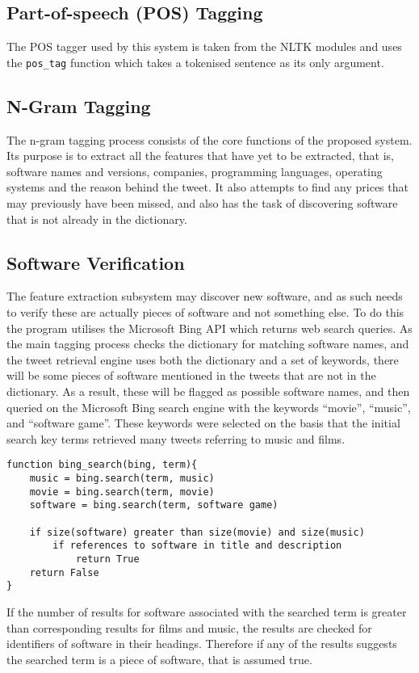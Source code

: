 \subsection{Part-of-speech (POS) Tagging}
The POS tagger used by this system is taken from the NLTK modules and uses the \texttt{pos\_tag} function which takes a tokenised sentence as its only argument.

\subsection{N-Gram Tagging}
The n-gram tagging process consists of the core functions of the proposed system. Its purpose is to extract all the features that have yet to be extracted, that is, software names and versions, companies, programming languages, operating systems and the reason behind the tweet. It also attempts to find any prices that may previously have been missed, and also has the task of discovering software that is not already in the dictionary.

\subsection{Software Verification}
The feature extraction subsystem may discover new software, and as such needs to verify these are actually pieces of software and not something else. To do this the program utilises the Microsoft Bing API which returns web search queries. As the main tagging process checks the dictionary for matching software names, and the tweet retrieval engine uses both the dictionary and a set of keywords, there will be some pieces of software mentioned in the tweets that are not in the dictionary. As a result, these will be flagged as possible software names, and then queried on the Microsoft Bing search engine with the keywords ``movie'', ``music'', and ``software game''. These keywords were selected on the basis that the initial search key terms retrieved many tweets referring to music and films.
\begin{verbatim}
function bing_search(bing, term){
    music = bing.search(term, music)
    movie = bing.search(term, movie)
    software = bing.search(term, software game)

    if size(software) greater than size(movie) and size(music)
        if references to software in title and description
            return True
    return False
}
\end{verbatim}
If the number of results for software associated with the searched term is greater than corresponding results for films and music, the results are checked for identifiers of software in their headings. Therefore if any of the results suggests the searched term is a piece of software, that is assumed true.

